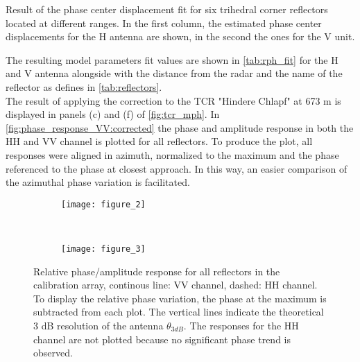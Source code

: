 \begin{table}[ht]
	\centering
	\caption{Result of the phase center displacement fit for six trihedral corner reflectors located at different ranges. In the first column, the estimated phase center displacements for the H antenna are shown, in the second the ones for the V unit.}
	\label{tab:rph_fit}
\end{table}
The resulting model parameters fit values  are shown in \autoref{tab:rph_fit} for the H and V antenna alongside with the distance from the radar and the name of the reflector as defines in \autoref{tab:reflectors}.\\
The result of applying the correction to the TCR "Hindere Chlapf" at 673 m is displayed in panels (c) and (f) of \autoref{fig:tcr_mph}.
In \autoref{fig:phase_response_VV:corrected} the phase and amplitude response in both the HH and VV channel is plotted for all reflectors. To produce the plot, all responses were aligned in azimuth, normalized to the maximum and the phase referenced to the phase at closest approach. In this way, an easier comparison of the azimuthal phase variation is facilitated.

\begin{figure*}[ht]
	\centering
	\begin{subfigure}[t]{\textwidth}
		\centering
		\texttt{[image: figure\_2]}
		\label{fig:phase_response_VV:uncorrected}
	\end{subfigure}\\
	\begin{subfigure}[t]{\textwidth}
		\centering
		\texttt{[image: figure\_3]}
		\label{fig:phase_response_VV:corrected}
	\end{subfigure}
	\caption{Relative phase/amplitude response for all reflectors in the calibration array, continous line: VV channel, dashed: HH channel. To display the relative phase variation, the phase at the maximum is subtracted from each plot. The vertical lines indicate the theoretical 3 dB resolution of the antenna $\theta_{3dB}$. The responses for the HH channel are not plotted because no significant phase trend is observed.}
	\label{fig:phase_response_VV}
\end{figure*}

